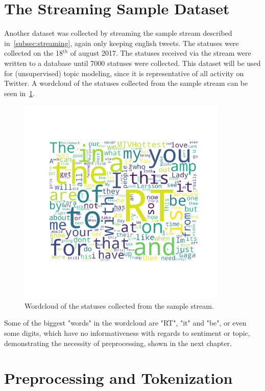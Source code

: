 \section{The Streaming Sample Dataset}
\label{sec:streamingSampleDataset}

Another dataset was collected by streaming the sample stream described in~\ref{subsec:streaming},
again only keeping english tweets.
The statuses were collected on the 18$^{th}$ of august 2017.
The statuses received via the stream were written to a database until 7000 statuses were collected.
This dataset will be used for (unsupervised) topic modeling, since it is representative of all activity on Twitter.
A wordcloud of the statuses collected from the sample stream can be seen in~\ref{fig:wordloud_pre}.

\begin{figure}
    \centering
    \caption{Wordcloud of the statuses collected from the sample stream.}
    \label{fig:wordloud_pre}
    \includegraphics[width=10cm]{../images/wordcloud_pre.png}
\end{figure}

Some of the biggest "words" in the wordcloud are "RT", "it" and "be",
or even some digits, which have no informativeness with regards to sentiment or topic,
demonstrating the necessity of preprocessing, shown in the next chapter.

\section{Preprocessing and Tokenization}
\label{sec:preprocessingAndTokenization}

